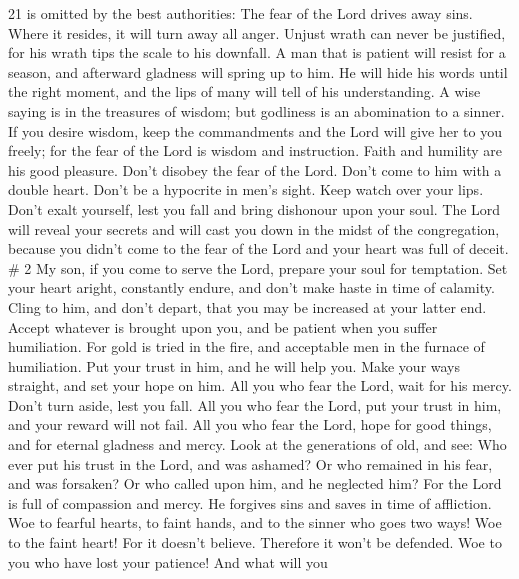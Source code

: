 21 is omitted by the best authorities: The fear of the Lord drives away
sins. Where it resides, it will turn away all anger. 
Unjust wrath can never be justified, for his wrath tips the scale to his
downfall.  A man that is patient will resist for a season,
and afterward gladness will spring up to him.  He will hide
his words until the right moment, and the lips of many will tell of his
understanding.  A wise saying is in the treasures of
wisdom; but godliness is an abomination to a sinner.  If
you desire wisdom, keep the commandments and the Lord will give her to
you freely;  for the fear of the Lord is wisdom and
instruction. Faith and humility are his good pleasure. 
Don't disobey the fear of the Lord. Don't come to him with a double
heart.  Don't be a hypocrite in men's sight. Keep watch
over your lips.  Don't exalt yourself, lest you fall and
bring dishonour upon your soul. The Lord will reveal your secrets and
will cast you down in the midst of the congregation, because you didn't
come to the fear of the Lord and your heart was full of deceit. \# 2
 My son, if you come to serve the Lord, prepare your soul
for temptation.  Set your heart aright, constantly endure,
and don't make haste in time of calamity.  Cling to him, and
don't depart, that you may be increased at your latter end. 
Accept whatever is brought upon you, and be patient when you suffer
humiliation.  For gold is tried in the fire, and acceptable
men in the furnace of humiliation.  Put your trust in him,
and he will help you. Make your ways straight, and set your hope on him.
 All you who fear the Lord, wait for his mercy. Don't turn
aside, lest you fall.  All you who fear the Lord, put your
trust in him, and your reward will not fail.  All you who
fear the Lord, hope for good things, and for eternal gladness and mercy.
 Look at the generations of old, and see: Who ever put his
trust in the Lord, and was ashamed? Or who remained in his fear, and was
forsaken? Or who called upon him, and he neglected him? 
For the Lord is full of compassion and mercy. He forgives sins and saves
in time of affliction.  Woe to fearful hearts, to faint
hands, and to the sinner who goes two ways!  Woe to the
faint heart! For it doesn't believe. Therefore it won't be defended.
 Woe to you who have lost your patience! And what will you
